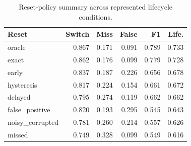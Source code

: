\begin{table}[t]
\centering
\caption{Reset-policy summary across represented lifecycle conditions.}
\label{tab:reset-summary}
\small
\begin{tabular}{lrrrrr}
\toprule
Reset & Switch & Miss & False & F1 & Life. \\
\midrule
oracle & 0.867 & 0.171 & 0.091 & 0.789 & 0.733 \\
exact & 0.862 & 0.176 & 0.099 & 0.779 & 0.728 \\
early & 0.837 & 0.187 & 0.226 & 0.656 & 0.678 \\
hysteresis & 0.817 & 0.224 & 0.154 & 0.661 & 0.672 \\
delayed & 0.795 & 0.274 & 0.119 & 0.662 & 0.662 \\
false\_positive & 0.820 & 0.193 & 0.295 & 0.545 & 0.643 \\
noisy\_corrupted & 0.781 & 0.260 & 0.214 & 0.557 & 0.626 \\
missed & 0.749 & 0.328 & 0.099 & 0.549 & 0.616 \\
\bottomrule
\end{tabular}
\end{table}
